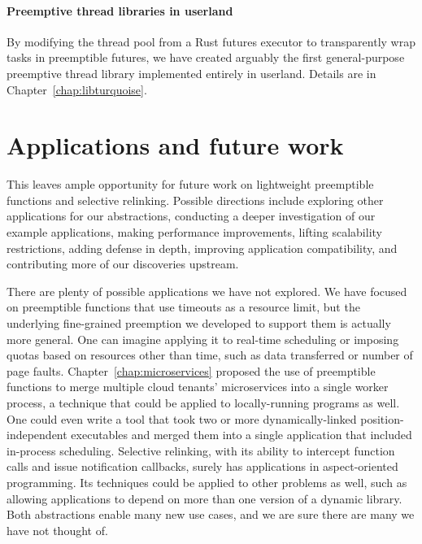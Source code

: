 \paragraph{Preemptive thread libraries in userland}
By modifying the thread pool from a Rust futures executor to transparently wrap
tasks in preemptible futures, we have created arguably the first general-purpose
preemptive thread library implemented entirely in userland.  Details are in
Chapter~\ref{chap:libturquoise}.


\section{Applications and future work}
\label{sec:thatsawrap:applications}

This \thesis leaves ample opportunity for future work on lightweight preemptible
functions and selective relinking.  Possible directions include exploring other
applications for our abstractions, conducting a deeper investigation of our example
applications, making performance improvements, lifting scalability restrictions,
adding defense in depth, improving application compatibility, and contributing more
of our discoveries upstream.

There are plenty of possible applications we have not explored.  We have focused on
preemptible functions that use timeouts as a resource limit, but the underlying
fine-grained preemption we developed to support them is actually more general.  One
can imagine applying it to real-time scheduling or imposing quotas based on resources
other than time, such as data transferred or number of page faults.
Chapter~\ref{chap:microservices} proposed the use of preemptible functions to merge
multiple cloud tenants' microservices into a single worker process, a technique that
could be applied to locally-running programs as well.  One could even write a tool
that took two or more dynamically-linked position-independent executables and merged
them into a single application that included in-process scheduling.  Selective
relinking, with its ability to intercept function calls and issue notification
callbacks, surely has applications in aspect-oriented programming.  Its techniques
could be applied to other problems as well, such as allowing applications to depend
on more than one version of a dynamic library.  Both abstractions enable many new use
cases, and we are sure there are many we have not thought of.

